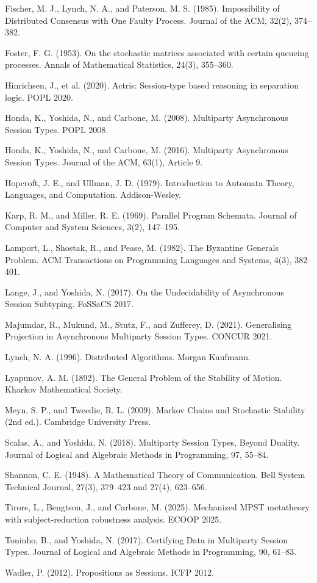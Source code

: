 \documentclass[a4paper,10pt,twocolumn,english]{article}
\numberwithin{equation}{section}
\theoremstyle{paperdef}
\theoremstyle{paperplain}
\theoremstyle{paperdef}
\theoremstyle{paperremark}
\newenvironment{citelist}{%
  \begin{list}{}{%
    \setlength{\leftmargin}{1.25em}%
    \setlength{\itemindent}{-1.25em}%
    \setlength{\itemsep}{2pt}%
    \setlength{\parsep}{0pt}%
    \setlength{\topsep}{3pt}}%
}{\end{list}}
\begin{document}
\begin{citelist}
	\item Fischer, M. J., Lynch, N. A., and Paterson, M. S. (1985). Impossibility of Distributed Consensus with One Faulty Process. Journal of the ACM, 32(2), 374--382.
	\item Foster, F. G. (1953). On the stochastic matrices associated with certain queueing processes. Annals of Mathematical Statistics, 24(3), 355--360.
	\item Hinrichsen, J., et al. (2020). Actris: Session-type based reasoning in separation logic. POPL 2020.
	\item Honda, K., Yoshida, N., and Carbone, M. (2008). Multiparty Asynchronous Session Types. POPL 2008.
	\item Honda, K., Yoshida, N., and Carbone, M. (2016). Multiparty Asynchronous Session Types. Journal of the ACM, 63(1), Article 9.
	\item Hopcroft, J. E., and Ullman, J. D. (1979). Introduction to Automata Theory, Languages, and Computation. Addison-Wesley.
	\item Karp, R. M., and Miller, R. E. (1969). Parallel Program Schemata. Journal of Computer and System Sciences, 3(2), 147--195.
	\item Lamport, L., Shostak, R., and Pease, M. (1982). The Byzantine Generals Problem. ACM Transactions on Programming Languages and Systems, 4(3), 382--401.
	\item Lange, J., and Yoshida, N. (2017). On the Undecidability of Asynchronous Session Subtyping. FoSSaCS 2017.
	\item Majumdar, R., Mukund, M., Stutz, F., and Zufferey, D. (2021). Generalising Projection in Asynchronous Multiparty Session Types. CONCUR 2021.
	\item Lynch, N. A. (1996). Distributed Algorithms. Morgan Kaufmann.
	\item Lyapunov, A. M. (1892). The General Problem of the Stability of Motion. Kharkov Mathematical Society.
	\item Meyn, S. P., and Tweedie, R. L. (2009). Markov Chains and Stochastic Stability (2nd ed.). Cambridge University Press.
	\item Scalas, A., and Yoshida, N. (2018). Multiparty Session Types, Beyond Duality. Journal of Logical and Algebraic Methods in Programming, 97, 55--84.
	\item Shannon, C. E. (1948). A Mathematical Theory of Communication. Bell System Technical Journal, 27(3), 379--423 and 27(4), 623--656.
	\item Tirore, L., Bengtson, J., and Carbone, M. (2025). Mechanized MPST metatheory with subject-reduction robustness analysis. ECOOP 2025.
	\item Toninho, B., and Yoshida, N. (2017). Certifying Data in Multiparty Session Types. Journal of Logical and Algebraic Methods in Programming, 90, 61--83.
	\item Wadler, P. (2012). Propositions as Sessions. ICFP 2012.
\end{citelist}
\end{document}
